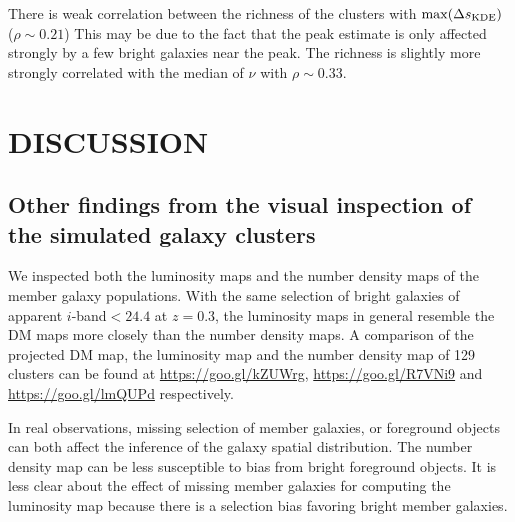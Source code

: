 There is weak correlation between the richness of the
clusters with $\max(\Delta s_{\rm KDE})$ ($\rho \sim 0.21$) This may be due to 
the fact that the peak estimate is only affected strongly by a few bright galaxies near 
the peak. The richness is slightly more strongly correlated with the median of $\nu$ 
with $\rho \sim 0.33$. 


% 
 
 
 
\section{DISCUSSION}\label{sec:discussion}

\subsection{Other findings from the visual inspection of the simulated galaxy clusters}
We inspected both the luminosity maps and the
number density maps of the member galaxy populations.
With the same selection of bright galaxies of apparent $i$-band$ < 24.4$ at
$z=0.3$, the luminosity maps in general resemble the DM maps more closely than 
the number density maps.
A comparison of the projected 
DM map, the luminosity map and the number density map of 129 clusters 
can be found at \href{https://goo.gl/kZUWrg}{https://goo.gl/kZUWrg}, 
\href{https://goo.gl/R7VNi9}{https://goo.gl/R7VNi9} and
\href{https://goo.gl/lmQUPd}{https://goo.gl/lmQUPd} respectively.

In real observations, missing selection of member galaxies, or 
foreground objects can both affect the inference of the galaxy spatial 
distribution. The number density map can be less susceptible to bias from bright 
foreground objects. It is less clear about the effect of missing member galaxies 
for computing the luminosity map because there is a selection bias favoring 
bright member galaxies.

